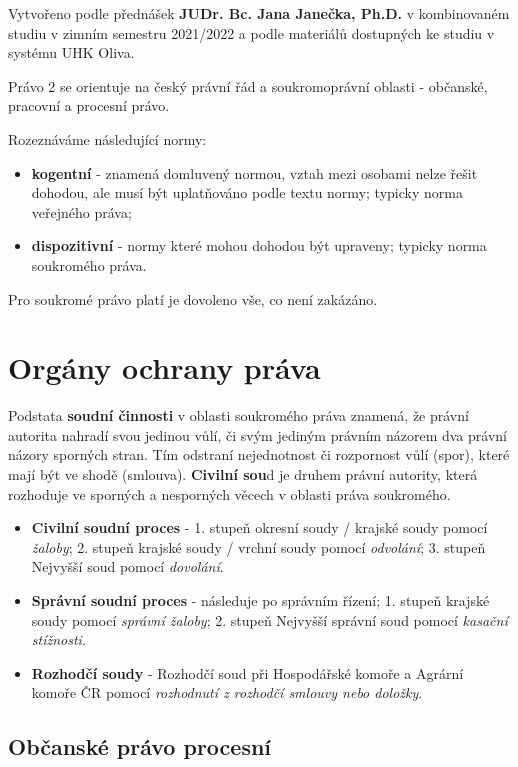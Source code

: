 \epigraph{Vytvořeno podle přednášek \textbf{JUDr. Bc. Jana Janečka, Ph.D.} v kombinovaném studiu v zimním semestru 2021/2022 a podle materiálů dostupných ke studiu v systému UHK Oliva.}{}

Právo 2 se orientuje na český právní řád a soukromoprávní oblasti - občanské, pracovní a procesní právo.

Rozeznáváme následující normy:

\begin{itemize}
\item \textbf{kogentní} - znamená domluvený normou, vztah mezi osobami nelze řešit dohodou, ale musí být uplatňováno podle textu normy; typicky norma veřejného práva;
\item \textbf{dispozitivní} - normy které mohou dohodou být upraveny; typicky norma soukromého práva.
\end{itemize}

Pro soukromé právo platí je dovoleno vše, co není zakázáno.

\section{Orgány ochrany práva}

Podstata \textbf{soudní činnosti} v oblasti soukromého práva znamená, že právní autorita nahradí svou jedinou vůlí, či svým jediným právním názorem dva právní názory sporných stran. Tím odstraní nejednotnost či rozpornost vůlí (spor), které mají být ve shodě (smlouva). \textbf{Civilní sou}d je druhem právní autority, která rozhoduje ve sporných a nesporných věcech v oblasti práva soukromého. 

\begin{itemize}
    \item \textbf{Civilní soudní proces} - 1. stupeň okresní soudy / krajské soudy pomocí \textit{žaloby}; 2. stupeň krajské soudy / vrchní soudy pomocí \textit{odvolání}; 3. stupeň Nejvyšší soud pomocí \textit{dovolání}.
    \item \textbf{Správní soudní proces} - následuje po správním řízení; 1. stupeň krajské soudy pomocí \textit{správní žaloby}; 2. stupeň Nejvyšší správní soud pomocí \textit{kasační stížnosti}.
    \item \textbf{Rozhodčí soudy} - Rozhodčí soud při Hospodářské komoře a Agrární komoře ČR pomocí \textit{rozhodnutí z rozhodčí smlouvy nebo doložky}.
\end{itemize}

\subsection{Občanské právo procesní}

